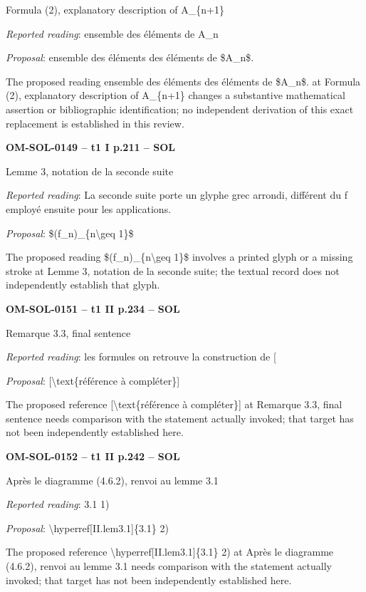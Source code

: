 Formula (2), explanatory description of A\_\{n+1\}\par
\emph{Reported reading}: ensemble des éléments de A\_n\par
\emph{Proposal}: ensemble des éléments des éléments de \$A\_n\$.\par
The proposed reading ensemble des éléments des éléments de \$A\_n\$. at Formula (2), explanatory description of A\_\{n+1\} changes a substantive mathematical assertion or bibliographic identification; no independent derivation of this exact replacement is established in this review.\par
\par\noindent\textbf{OM-SOL-0149 -- t1 I p.211 -- SOL}\par
Lemme 3, notation de la seconde suite\par
\emph{Reported reading}: La seconde suite porte un glyphe grec arrondi, différent du f employé ensuite pour les applications.\par
\emph{Proposal}: \$(f\_n)\_\{n\textbackslash{}geq 1\}\$\par
The proposed reading \$(f\_n)\_\{n\textbackslash{}geq 1\}\$ involves a printed glyph or a missing stroke at Lemme 3, notation de la seconde suite; the textual record does not independently establish that glyph.\par
\par\noindent\textbf{OM-SOL-0151 -- t1 II p.234 -- SOL}\par
Remarque 3.3, final sentence\par
\emph{Reported reading}: les formules on retrouve la construction de [\par
\emph{Proposal}: [\textbackslash{}text\{référence à compléter\}]\par
The proposed reference [\textbackslash{}text\{référence à compléter\}] at Remarque 3.3, final sentence needs comparison with the statement actually invoked; that target has not been independently established here.\par
\par\noindent\textbf{OM-SOL-0152 -- t1 II p.242 -- SOL}\par
Après le diagramme (4.6.2), renvoi au lemme 3.1\par
\emph{Reported reading}: 3.1 1)\par
\emph{Proposal}: \textbackslash{}hyperref[II.lem3.1]\{3.1\} 2)\par
The proposed reference \textbackslash{}hyperref[II.lem3.1]\{3.1\} 2) at Après le diagramme (4.6.2), renvoi au lemme 3.1 needs comparison with the statement actually invoked; that target has not been independently established here.\par
